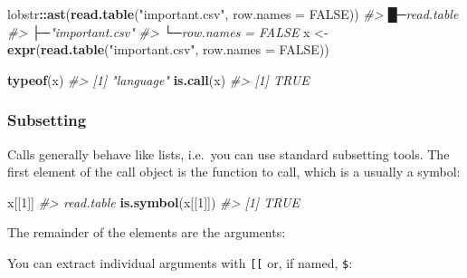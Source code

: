 \documentclass[]{book}
\newenvironment{Shaded}{\begin{snugshade}}{\end{snugshade}}
\newcommand{\CommentTok}[1]{\textcolor[rgb]{0.37,0.37,0.37}{\textit{#1}}}
\newcommand{\DataTypeTok}[1]{\textcolor[rgb]{0.27,0.27,0.27}{#1}}
\newcommand{\DecValTok}[1]{\textcolor[rgb]{0.06,0.06,0.06}{#1}}
\newcommand{\KeywordTok}[1]{\textcolor[rgb]{0.27,0.27,0.27}{\textbf{#1}}}
\newcommand{\NormalTok}[1]{#1}
\newcommand{\OperatorTok}[1]{\textcolor[rgb]{0.43,0.43,0.43}{\textbf{#1}}}
\newcommand{\OtherTok}[1]{\textcolor[rgb]{0.37,0.37,0.37}{#1}}
\newcommand{\StringTok}[1]{\textcolor[rgb]{0.5,0.5,0.5}{#1}}
\begin{document}
\begin{Shaded}
\begin{Highlighting}[]
\NormalTok{lobstr}\OperatorTok{::}\KeywordTok{ast}\NormalTok{(}\KeywordTok{read.table}\NormalTok{(}\StringTok{"important.csv"}\NormalTok{, }\DataTypeTok{row.names =} \OtherTok{FALSE}\NormalTok{))}
\CommentTok{#> █─read.table }
\CommentTok{#> ├─"important.csv" }
\CommentTok{#> └─row.names = FALSE}
\NormalTok{x <-}\StringTok{ }\KeywordTok{expr}\NormalTok{(}\KeywordTok{read.table}\NormalTok{(}\StringTok{"important.csv"}\NormalTok{, }\DataTypeTok{row.names =} \OtherTok{FALSE}\NormalTok{))}

\KeywordTok{typeof}\NormalTok{(x)}
\CommentTok{#> [1] "language"}
\KeywordTok{is.call}\NormalTok{(x)}
\CommentTok{#> [1] TRUE}
\end{Highlighting}
\end{Shaded}

\hypertarget{subsetting}{%
\subsubsection{Subsetting}\label{subsetting}}


Calls generally behave like lists, i.e.~you can use standard subsetting tools. The first element of the call object is the function to call, which is a usually a symbol:

\begin{Shaded}
\begin{Highlighting}[]
\NormalTok{x[[}\DecValTok{1}\NormalTok{]]}
\CommentTok{#> read.table}
\KeywordTok{is.symbol}\NormalTok{(x[[}\DecValTok{1}\NormalTok{]])}
\CommentTok{#> [1] TRUE}
\end{Highlighting}
\end{Shaded}

The remainder of the elements are the arguments:

\begin{Shaded}
\end{Shaded}

You can extract individual arguments with \texttt{{[}{[}} or, if named, \texttt{\$}:
\end{document}
